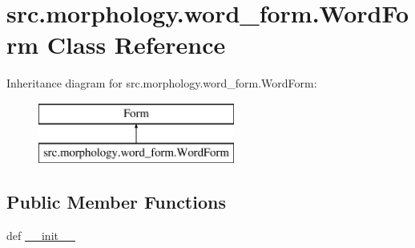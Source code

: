 \hypertarget{classsrc_1_1morphology_1_1word__form_1_1_word_form}{\section{src.\+morphology.\+word\+\_\+form.\+Word\+Form Class Reference}
\label{classsrc_1_1morphology_1_1word__form_1_1_word_form}
}
Inheritance diagram for src.\+morphology.\+word\+\_\+form.\+Word\+Form\+:\begin{figure}[H]
\begin{center}
\leavevmode
\includegraphics[height=2.000000cm]{classsrc_1_1morphology_1_1word__form_1_1_word_form}
\end{center}
\end{figure}
\subsection*{Public Member Functions}
\begin{DoxyCompactItemize}
\item 
def \hyperlink{classsrc_1_1morphology_1_1word__form_1_1_word_form_a739f72b577db8e5cf86463a0d82bbe05}{\+\_\+\+\_\+init\+\_\+\+\_\+}
\end{DoxyCompactItemize}
